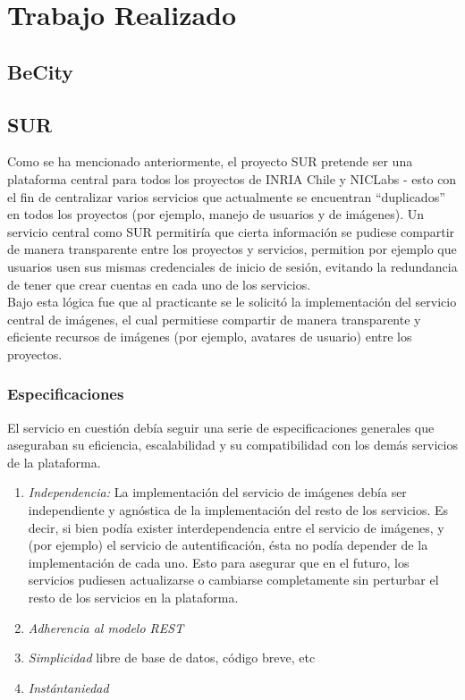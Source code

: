 \documentclass[11pt,letterpaper]{article}
\begin{document}
\newpage
\section{Trabajo Realizado}

\subsection{BeCity}
\subsection{SUR}

Como se ha mencionado anteriormente, el proyecto SUR pretende ser una plataforma central para todos los proyectos de INRIA Chile y NICLabs - esto con el fin de centralizar varios servicios que actualmente se encuentran ``duplicados'' en todos los proyectos (por ejemplo, manejo de usuarios y de imágenes). Un servicio central como SUR permitiría que cierta información se pudiese compartir de manera transparente entre los proyectos y servicios, permition por ejemplo que usuarios usen sus mismas credenciales de inicio de sesión, evitando la redundancia de tener que crear cuentas en cada uno de los servicios.
\\
Bajo esta lógica fue que al practicante se le solicitó la implementación del servicio central de imágenes, el cual permitiese compartir de manera transparente y eficiente recursos de imágenes (por ejemplo, avatares de usuario) entre los proyectos.

\subsubsection{Especificaciones}

El servicio en cuestión debía seguir una serie de especificaciones generales que aseguraban su eficiencia, escalabilidad y su compatibilidad con los demás servicios de la plataforma.

\begin{enumerate}
    \item \emph{Independencia:} \@ La implementación del servicio de imágenes debía ser independiente y agnóstica de la implementación del resto de los servicios. Es decir, si bien podía exister interdependencia entre el servicio de imágenes, y (por ejemplo) el servicio de autentificación, ésta no podía depender de la implementación de cada uno. Esto para asegurar que en el futuro, los servicios pudiesen actualizarse o cambiarse completamente sin perturbar el resto de los servicios en la plataforma.
    \item \emph{Adherencia al modelo REST} \@
    \item \emph{Simplicidad} \@ libre de base de datos, código breve, etc
    \item \emph{Instántaniedad}
\end{enumerate}
\end{document}
